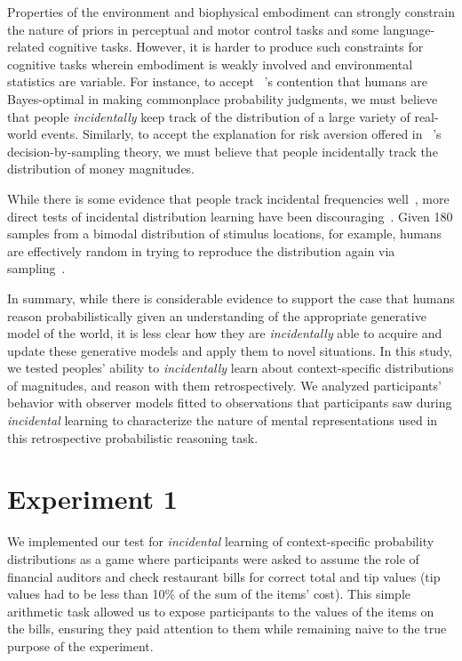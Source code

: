 \documentclass[10pt,letterpaper]{article}
\begin{document}
Properties of the environment and biophysical embodiment can strongly constrain the nature of priors in perceptual and motor control tasks and some language-related cognitive tasks. However, it is harder to produce such constraints for cognitive tasks wherein embodiment is weakly involved and environmental statistics are variable. For instance, to accept ~'s contention that humans are Bayes-optimal in making commonplace probability judgments, we must believe that people {\em incidentally} keep track of the distribution of a large variety of real-world events. Similarly, to accept the explanation for risk aversion offered in ~'s decision-by-sampling theory, we must believe that people incidentally track the distribution of money magnitudes. 

While there is some evidence that people track incidental frequencies well~\cite{hz84}, more direct tests of incidental distribution learning have been discouraging~\cite{sailor2005memory, tvp17}. Given 180 samples from a bimodal distribution of stimulus locations, for example, humans are effectively random in trying to reproduce the distribution again via sampling~\cite{tvp17}. 

In summary, while there is considerable evidence to support the case that humans reason probabilistically given an understanding of the appropriate generative model of the world, it is less clear how they are {\em incidentally} able to acquire and update these generative models and apply them to novel situations. In this study, we tested peoples' ability to {\em incidentally} learn about context-specific distributions of magnitudes, and reason with them retrospectively. We analyzed participants' behavior with observer models fitted to observations that participants saw during {\em incidental} learning to characterize the nature of mental representations used in this retrospective probabilistic reasoning task.

\section{Experiment 1}


We implemented our test for {\em incidental} learning of context-specific probability distributions as a game where participants were asked to assume the role of financial auditors and check restaurant bills for correct total and tip values (tip values had to be less than 10\% of the sum of the items' cost). This simple arithmetic task allowed us to expose participants to the values of the items on the bills, ensuring they paid attention to them while remaining naive to the true purpose of the experiment. 
	
\end{document}
